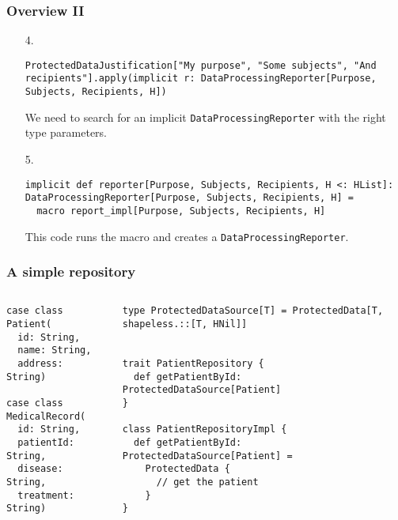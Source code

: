 \documentclass[aspectratio=169]{beamer}
\begin{document}
\begin{frame}[fragile]
\frametitle{Overview II}

\begin{enumerate}
\item[4.]
\begin{lstlisting}[style=myScalastyle,frame=none]
ProtectedDataJustification["My purpose", "Some subjects", "And recipients"].apply(implicit r: DataProcessingReporter[Purpose, Subjects, Recipients, H])
\end{lstlisting}
We need to search for an implicit \texttt{DataProcessingReporter} with the right type parameters.
\item[5.]

\begin{lstlisting}[style=myScalastyle,frame=none]
  implicit def reporter[Purpose, Subjects, Recipients, H <: HList]: DataProcessingReporter[Purpose, Subjects, Recipients, H] =
  macro report_impl[Purpose, Subjects, Recipients, H]
\end{lstlisting}
This code runs the macro and creates a \texttt{DataProcessingReporter}.
\end{enumerate}
\end{frame}

\begin{frame}[fragile]
\frametitle{A simple repository}

\begin{columns}
\begin{column}{0.3\textwidth}

\begin{lstlisting}[style=myScalastyle,frame=none]
case class Patient(
  id: String,
  name: String,
  address: String)
  
case class MedicalRecord(
  id: String,
  patientId: String,
  disease: String,
  treatment: String)
\end{lstlisting}


\end{column}
\vrule
\begin{column}{0.7\textwidth}  

\begin{lstlisting}[style=myScalastyle,frame=none]
type ProtectedDataSource[T] = ProtectedData[T, shapeless.::[T, HNil]]  


trait PatientRepository {
  def getPatientById: ProtectedDataSource[Patient]
}

class PatientRepositoryImpl {
  def getPatientById: ProtectedDataSource[Patient] =
    ProtectedData {
      // get the patient
    }
}

\end{lstlisting}


\end{column}
\end{columns}

\end{frame}
\end{document}
